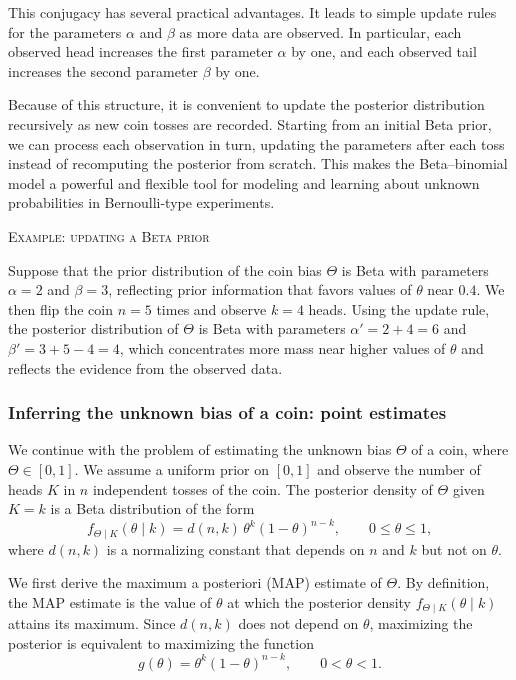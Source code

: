 This conjugacy has several practical advantages.  
It leads to simple update rules for the parameters \(\alpha\) and \(\beta\) as more data are observed.  
In particular, each observed head increases the first parameter \(\alpha\) by one, and each observed tail increases the second parameter \(\beta\) by one.  

Because of this structure, it is convenient to update the posterior distribution recursively as new coin tosses are recorded.  
Starting from an initial Beta prior, we can process each observation in turn, updating the parameters after each toss instead of recomputing the posterior from scratch.  
This makes the Beta–binomial model a powerful and flexible tool for modeling and learning about unknown probabilities in Bernoulli-type experiments.

\bigskip
\textsc{Example: updating a Beta prior}

Suppose that the prior distribution of the coin bias \(\Theta\) is Beta with parameters \(\alpha = 2\) and \(\beta = 3\), reflecting prior information that favors values of \(\theta\) near \(0.4\).  
We then flip the coin \(n = 5\) times and observe \(k = 4\) heads.  
Using the update rule, the posterior distribution of \(\Theta\) is Beta with parameters \(\alpha' = 2 + 4 = 6\) and \(\beta' = 3 + 5 - 4 = 4\), which concentrates more mass near higher values of \(\theta\) and reflects the evidence from the observed data.


\subsubsection{Inferring the unknown bias of a coin: point estimates}

We continue with the problem of estimating the unknown bias \(\Theta\) of a coin, where \(\Theta \in [0,1]\).  
We assume a uniform prior on \([0,1]\) and observe the number of heads \(K\) in \(n\) independent tosses of the coin.  
The posterior density of \(\Theta\) given \(K = k\) is a Beta distribution of the form
\[
f_{\Theta \mid K}(\theta \mid k)
=
d(n,k)\,\theta^{k}(1-\theta)^{n-k},
\qquad
0 \leq \theta \leq 1,
\]
where \(d(n,k)\) is a normalizing constant that depends on \(n\) and \(k\) but not on \(\theta\).  

We first derive the maximum a posteriori (MAP) estimate of \(\Theta\).  
By definition, the MAP estimate is the value of \(\theta\) at which the posterior density \(f_{\Theta \mid K}(\theta \mid k)\) attains its maximum.  
Since \(d(n,k)\) does not depend on \(\theta\), maximizing the posterior is equivalent to maximizing the function
\[
g(\theta)
=
\theta^{k}(1-\theta)^{n-k},
\qquad
0 < \theta < 1.
\]

